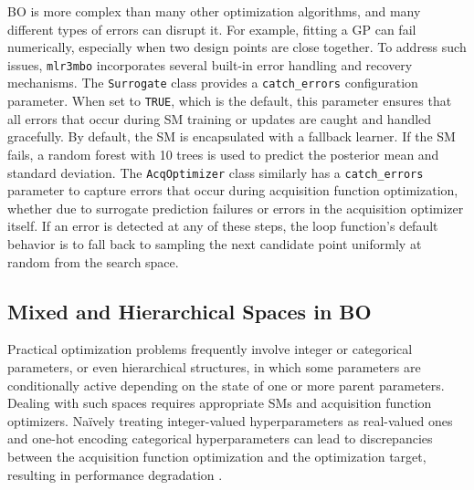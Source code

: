 \documentclass[12pt,letterpaper]{article}
\begin{document}
BO is more complex than many other optimization algorithms, and many different types of errors can disrupt it.
For example, fitting a GP can fail numerically, especially when two design points are close together.
To address such issues, \texttt{mlr3mbo} incorporates several built-in error handling and recovery mechanisms.
The \texttt{Surrogate} class provides a \texttt{catch\_errors} configuration parameter.
When set to \texttt{TRUE}, which is the default, this parameter ensures that all errors that occur during SM training or updates are caught and handled gracefully.
By default, the SM is encapsulated with a fallback learner.
If the SM fails, a random forest with 10 trees is used to predict the posterior mean and standard deviation.
The \texttt{AcqOptimizer} class similarly has a \texttt{catch\_errors} parameter to capture errors that occur during acquisition function optimization, whether due to surrogate prediction failures or errors in the acquisition optimizer itself.
If an error is detected at any of these steps, the loop function's default behavior is to fall back to sampling the next candidate point uniformly at random from the search space.

\subsection*{Mixed and Hierarchical Spaces in BO}

\label{sec:mixed-space-optimization}

Practical optimization problems frequently involve integer or categorical parameters, or even hierarchical structures, in which some parameters are conditionally active depending on the state of one or more parent parameters. 
Dealing with such spaces requires appropriate SMs and acquisition function optimizers.
Na\"ively treating integer-valued hyperparameters as real-valued ones and one-hot encoding categorical hyperparameters can lead to discrepancies between the acquisition function optimization and the optimization target, resulting in performance degradation \cite{garrido-merchan2020}.
\end{document}
